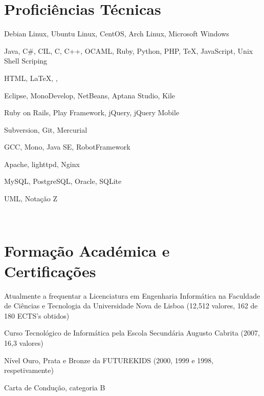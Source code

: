 \documentclass[a4paper,fontsize=10pt]{scrartcl} %
\begin{document}
\begin{minipage}[t]{0.46\textwidth} %

\vspace{0pt} %
	
\section{Proficiências Técnicas}
\begin{inparaitem}
\item[] Debian Linux, Ubuntu Linux, CentOS, Arch Linux,  Microsoft Windows
\item Java, C\#, CIL, C, C++, OCAML, Ruby, Python, PHP, \TeX, JavaScript, Unix Shell Scriping
\item HTML, \LaTeX, \XeTeX, \XeLaTeX\
\item Eclipse, MonoDevelop, NetBeans, Aptana Studio, Kile
\item Ruby on Rails, Play Framework, jQuery, jQuery Mobile
\item Subversion, Git, Mercurial
\item GCC, Mono, Java SE, RobotFramework 
\item Apache, lighttpd, Nginx
\item MySQL, PostgreSQL, Oracle, SQLite
\item UML, Nota\c{c}ão Z
\end{inparaitem}\\\par
\section{Forma\c{c}ão Académica e Certifica\c{c}ões}
\begin{inparaitem}
\item[] Atualmente a frequentar a Licenciatura em Engenharia Informática na Faculdade de Ciências e Tecnologia da Universidade Nova de Lisboa (12,512 valores, 162 de 180 ECTS's obtidos)
\item Curso Tecnológico de Informática pela Escola Secundária Augusto Cabrita (2007, 16,3 valores)
\item Nível Ouro, Prata e Bronze da FUTUREKIDS (2000, 1999 e 1998, respetivamente)
\item Carta de Condu\c{c}ão, categoria B
\end{inparaitem}
\\\par

\end{minipage}
\end{document}
